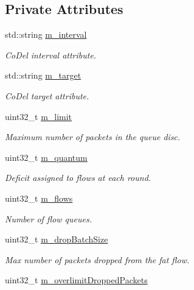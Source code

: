 \subsection*{Private Attributes}
\begin{DoxyCompactItemize}
\item 
std\+::string \hyperlink{classns3_1_1FqCoDelQueueDisc_a4662972dcde7a505bc19b23ebe842de5}{m\+\_\+interval}
\begin{DoxyCompactList}\small\item\em Co\+Del interval attribute. \end{DoxyCompactList}\item 
std\+::string \hyperlink{classns3_1_1FqCoDelQueueDisc_a6bc9b101ee9aa76c0ace0d3ccd6bb3c4}{m\+\_\+target}
\begin{DoxyCompactList}\small\item\em Co\+Del target attribute. \end{DoxyCompactList}\item 
uint32\+\_\+t \hyperlink{classns3_1_1FqCoDelQueueDisc_a7730a22f6e323d171f58aad51d97659c}{m\+\_\+limit}
\begin{DoxyCompactList}\small\item\em Maximum number of packets in the queue disc. \end{DoxyCompactList}\item 
uint32\+\_\+t \hyperlink{classns3_1_1FqCoDelQueueDisc_ad4638258d780533e28cb83f27fb63a6c}{m\+\_\+quantum}
\begin{DoxyCompactList}\small\item\em Deficit assigned to flows at each round. \end{DoxyCompactList}\item 
uint32\+\_\+t \hyperlink{classns3_1_1FqCoDelQueueDisc_afdd4c8c212430bea70aefde0df14df43}{m\+\_\+flows}
\begin{DoxyCompactList}\small\item\em Number of flow queues. \end{DoxyCompactList}\item 
uint32\+\_\+t \hyperlink{classns3_1_1FqCoDelQueueDisc_a55b30ed7f12ccd45ced132f08543ddd3}{m\+\_\+drop\+Batch\+Size}
\begin{DoxyCompactList}\small\item\em Max number of packets dropped from the fat flow. \end{DoxyCompactList}\item 
uint32\+\_\+t \hyperlink{classns3_1_1FqCoDelQueueDisc_ab68732cc8cac53970d8bb17dd92421b5}{m\+\_\+overlimit\+Dropped\+Packets}

\end{DoxyCompactItemize}
